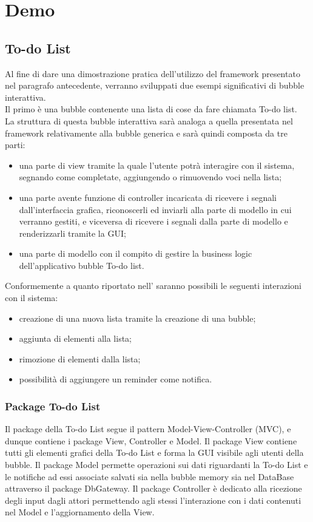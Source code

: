 \section{Demo}

\subsection{To-do List}
Al fine di dare una dimostrazione pratica dell'utilizzo del framework presentato nel paragrafo antecedente, verranno sviluppati due esempi significativi di bubble interattiva.\\
Il primo è una bubble contenente una lista di cose da fare chiamata To-do list.\\
La struttura di questa bubble interattiva sarà analoga a quella presentata nel framework relativamente alla bubble generica e sarà quindi composta da tre parti:
\begin{itemize}
	\item una parte di view tramite la quale l'utente potrà interagire con il sistema, segnando come completate, aggiungendo o rimuovendo voci nella lista;
	\item una parte avente funzione di controller incaricata di ricevere i segnali dall'interfaccia grafica, riconoscerli ed inviarli alla parte di modello in cui verranno gestiti, e viceversa di ricevere i segnali dalla parte di modello e renderizzarli tramite la GUI;
	\item una parte di modello con il compito di gestire la business logic dell'applicativo bubble To-do list.
\end{itemize}
Conformemente a quanto riportato nell'\AnalisiDeiRequisiti{} saranno possibili le seguenti interazioni con il sistema:
\begin{itemize}
	\item creazione di una nuova lista tramite la creazione di una bubble;
	\item aggiunta di elementi alla lista;
	\item rimozione di elementi dalla lista;
	\item possibilità di aggiungere un reminder come notifica.
\end{itemize}

\subsubsection{Package To-do List}

Il package della To-do List segue il pattern Model-View-Controller (MVC), e dunque contiene i package View, Controller e Model. Il package View contiene tutti gli elementi grafici della To-do List e forma la GUI visibile agli utenti della bubble. Il package Model permette operazioni sui dati riguardanti la To-do List e le notifiche ad essi associate salvati sia nella bubble memory sia nel DataBase attraverso il package Db\-Gateway. Il package Controller è dedicato alla ricezione degli input dagli attori permettendo agli stessi l'interazione con i dati contenuti nel Model e l'aggiornamento della View.

